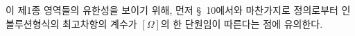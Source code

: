 
이 제1종 영역들의 유한성을 보이기 위해, 먼저 \S\ 10에서와 마찬가지로 정의로부터 인볼루션형식의 최고차항의 계수가 $[\Omega]$의 한 단원임이 따른다는 점에 유의한다.

